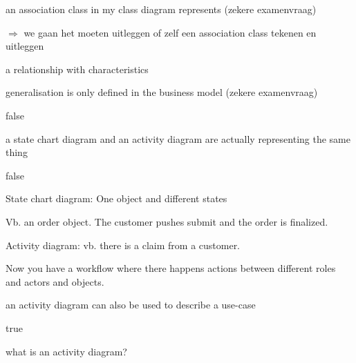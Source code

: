 \begin{question}
an association class in my class diagram represents (zekere examenvraag)
\end{question}

\begin{solution}[print]
$\Rightarrow$ we gaan het moeten uitleggen of zelf een association class tekenen en uitleggen

a relationship with characteristics
\end{solution}



\begin{question}
generalisation is only defined in the business model (zekere examenvraag)
\end{question}

\begin{solution}[print]
false
\end{solution}



\begin{question}
a state chart diagram and an activity diagram are actually representing the same thing
\end{question}

\begin{solution}[print]
false

State chart diagram: One object and different states

Vb. an order object. The customer pushes submit and the order is finalized.

Activity diagram: vb. there is a claim from a customer.

Now you have a workflow where there happens actions between different roles and actors and objects.
\end{solution}



\begin{question}
an activity diagram can also be used to describe a use-case
\end{question}

\begin{solution}[print]
true
\end{solution}



\begin{question}
what is an activity diagram?
\end{question}

\begin{solution}[print]

\end{solution}



